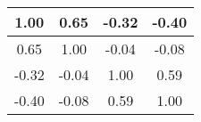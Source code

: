 \begin{tabular}{|c|c|c|c|}
\hline
1.00&0.65&-0.32&-0.40\\\hline
0.65&1.00&-0.04&-0.08\\\hline
-0.32&-0.04&1.00&0.59\\\hline
-0.40&-0.08&0.59&1.00\\\hline
\end{tabular}
